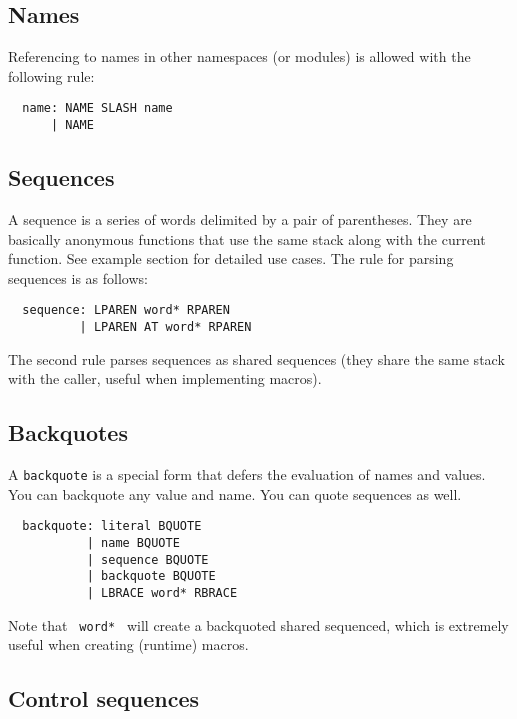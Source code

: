 \documentclass{book}
\begin{document}
\subsection{Names}

Referencing to names in other namespaces (or modules) is allowed with the following rule:
\begin{verbatim}
  name: NAME SLASH name
      | NAME
\end{verbatim}

\subsection{Sequences}

A sequence is a series of words delimited by a pair of parentheses. They are basically anonymous functions that use the same stack along with the current function. See example section for detailed use cases. The rule for parsing sequences is as follows:
\begin{verbatim}
  sequence: LPAREN word* RPAREN
          | LPAREN AT word* RPAREN
\end{verbatim}

The second rule parses sequences as shared sequences (they share the same stack with the caller, useful when implementing macros).

\subsection{Backquotes}

A \texttt{backquote} is a special form that defers the evaluation of names and values. You can backquote any value and name. You can quote sequences as well.
\begin{verbatim}
  backquote: literal BQUOTE
           | name BQUOTE
           | sequence BQUOTE
           | backquote BQUOTE
           | LBRACE word* RBRACE
\end{verbatim}

Note that \texttt{{ word* }} will create a backquoted shared sequenced, which is extremely useful when creating (runtime) macros.

\subsection{Control sequences}
\end{document}
